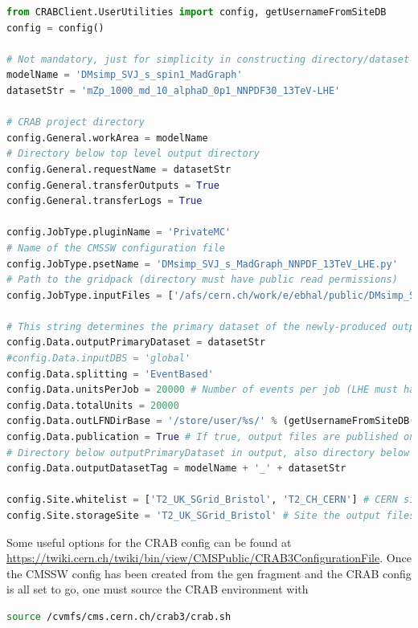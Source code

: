 \begin{lstlisting}[belowskip=-0.7cm, language=Python, numbers=none]
from CRABClient.UserUtilities import config, getUsernameFromSiteDB
config = config()

# Not mandatory, just for simplicity in constructing directory/dataset names
modelName = 'DMsimp_SVJ_s_spin1_MadGraph'
datasetStr = 'mZp_1000_md_10_alphaD_0p1_NNPDF30_13TeV-LHE'

# CRAB project directory
config.General.workArea = modelName
# Directory below top level output directory
config.General.requestName = datasetStr
config.General.transferOutputs = True
config.General.transferLogs = True

config.JobType.pluginName = 'PrivateMC'
# Name of the CMSSW configuration file
config.JobType.psetName = 'DMsimp_SVJ_s_MadGraph_NNPDF_13TeV_LHE.py'
# Path to the gridpack (directory must have public read permissions)
config.JobType.inputFiles = ['/afs/cern.ch/work/e/ebhal/public/DMsimp_SVJ_s_spin1_slc6_amd64_gcc481_CMSSW_7_1_30_tarball.tar.xz']

# This string determines the primary dataset of the newly-produced output
config.Data.outputPrimaryDataset = datasetStr
#config.Data.inputDBS = 'global'
config.Data.splitting = 'EventBased'
config.Data.unitsPerJob = 20000 # Number of events per job (LHE must have 1 job due to RNG)
config.Data.totalUnits = 20000
config.Data.outLFNDirBase = '/store/user/%s/' % (getUsernameFromSiteDB())
config.Data.publication = True # If true, output files are published on DBS. Useful for future steps 
# Directory below outputPrimaryDataset in output, also directory below workArea in project dir
config.Data.outputDatasetTag = modelName + '_' + datasetStr

config.Site.whitelist = ['T2_UK_SGrid_Bristol', 'T2_CH_CERN'] # CERN site needed so CRAB worker nodes with /afs mounted can be used
config.Site.storageSite = 'T2_UK_SGrid_Bristol' # Site the output files will be transmitted to
\end{lstlisting}

Some useful options for the CRAB config can be found at \url{https://twiki.cern.ch/twiki/bin/view/CMSPublic/CRAB3ConfigurationFile}. Once the CMSSW config has been created from the gen fragment and the CRAB config is all set to go, one must source the CRAB environment with

\begin{lstlisting}[belowskip=-0.7cm, language=sh, numbers=none]
source /cvmfs/cms.cern.ch/crab3/crab.sh
\end{lstlisting}

